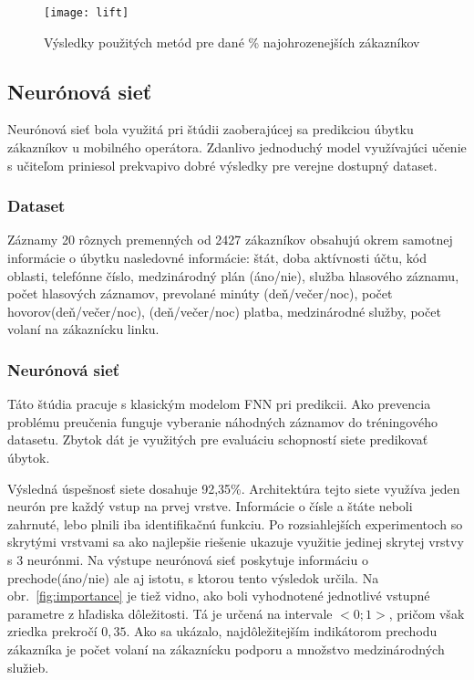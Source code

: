 \begin{figure}[H]
\begin{center}
\texttt{[image: lift]}\end{center}
\caption[lift]{Výsledky použitých metód pre dané \% najohrozenejších zákazníkov}\label{fig:lift}
\end{figure}

\subsection{Neurónová sieť}
\label{metoda_neuronova_siet}

Neurónová sieť bola využitá pri štúdii zaoberajúcej sa predikciou úbytku zákazníkov u mobilného operátora. Zdanlivo jednoduchý model využívajúci učenie s učiteľom priniesol prekvapivo dobré výsledky pre verejne dostupný dataset.%

\subsubsection{Dataset}
\label{nn_dataset}

Záznamy 20 rôznych premenných od 2427 zákazníkov obsahujú okrem samotnej informácie o úbytku nasledovné informácie:
\newline
štát, doba aktívnosti účtu, kód oblasti, telefónne číslo, medzinárodný plán (áno/nie), služba hlasového záznamu, počet hlasových záznamov, prevolané minúty (deň/večer/noc), počet hovorov(deň/večer/noc), (deň/večer/noc) platba, medzinárodné služby, počet volaní na zákaznícku linku.

\subsubsection{Neurónová sieť}
\label{metoda_nn}

Táto štúdia pracuje s klasickým modelom FNN pri predikcii. Ako prevencia problému preučenia funguje vyberanie náhodných záznamov do tréningového datasetu. Zbytok dát je využitých pre evaluáciu schopností siete predikovať úbytok.

Výsledná úspešnosť siete dosahuje 92,35\%. Architektúra tejto siete využíva jeden neurón pre každý vstup na prvej vrstve. Informácie o čísle a štáte neboli zahrnuté, lebo plnili iba identifikačnú funkciu. Po rozsiahlejších experimentoch so skrytými vrstvami sa ako najlepšie riešenie ukazuje využitie jedinej skrytej vrstvy s 3 neurónmi. Na výstupe neurónová sieť poskytuje informáciu o prechode(áno/nie) ale aj istotu, s ktorou tento výsledok určila. 
\newline
Na obr.~\ref{fig:importance} je tiež vidno, ako boli vyhodnotené jednotlivé vstupné parametre z hľadiska dôležitosti. Tá je určená na intervale $<0; 1>$, pričom však zriedka prekročí $0,35$. Ako sa ukázalo, najdôležitejším indikátorom prechodu zákazníka je počet volaní na zákaznícku podporu a množstvo medzinárodných služieb.

